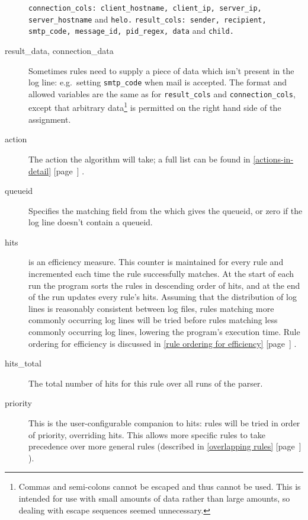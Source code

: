 \documentclass[a4paper,12pt,draft]{article}
\newcommand{\refwithpage}[1]{%
    \empty{}\ref{#1} [page~\pageref{#1}]%
}
\newcommand{\sectionref}[1]{%
    \textsection{}\refwithpage{#1}%
}
\newcommand{\tab}[0]{%
    \hspace*{2em}%
}
\begin{document}
\begin{description}
        \texttt{connection\_cols: client\_hostname, client\_ip, server\_ip,
        \newline \tab{} server\_hostname} and \texttt{helo.\newline}
        \texttt{result\_cols: sender, recipient, smtp\_code, message\_id,
        \newline \tab{} pid\_regex, data} and \texttt{child.}

    \item [result\_data, connection\_data] Sometimes rules need to supply a
        piece of data which isn't present in the log line: e.g.\ setting
        \texttt{smtp\_code} when mail is accepted.  The format and allowed
        variables are the same as for \texttt{result\_cols} and
        \texttt{connection\_cols}, except that arbitrary
        data\footnote{Commas and semi-colons cannot be escaped and thus
        cannot be used.  This is intended for use with small amounts of
        data rather than large amounts, so dealing with escape sequences
        seemed unnecessary.} is permitted on the right hand side of the
        assignment.

    \item [action] The action the algorithm will take; a full list can be
        found in \sectionref{actions-in-detail}.

    \item [queueid] Specifies the matching field from the \regex{} which
        gives the queueid, or zero if the log line doesn't contain a
        queueid.

    \item [hits] is an efficiency measure.  This counter is maintained for
        every rule and incremented each time the rule successfully matches.
        At the start of each run the program sorts the rules in descending
        order of hits, and at the end of the run updates every rule's hits.
        Assuming that the distribution of log lines is reasonably
        consistent between log files, rules matching more commonly
        occurring log lines will be tried before rules matching less
        commonly occurring log lines, lowering the program's execution
        time.  Rule ordering for efficiency is discussed in
        \sectionref{rule ordering for efficiency}.

    \item [hits\_total] The total number of hits for this rule over all
        runs of the parser.

    \item [priority] This is the user-configurable companion to hits: rules
        will be tried in order of priority, overriding hits.  This allows
        more specific rules to take precedence over more general rules
        (described in \sectionref{overlapping rules}).

\end{description}
\end{document}
